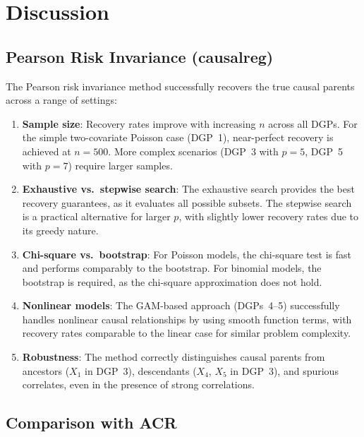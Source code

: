 \documentclass[11pt,a4paper]{article}
\begin{document}
\section{Discussion}

\subsection{Pearson Risk Invariance (causalreg)}

The Pearson risk invariance method successfully recovers the true causal parents across a range of settings:

\begin{enumerate}
    \item \textbf{Sample size}: Recovery rates improve with increasing $n$ across all DGPs. For the simple two-covariate Poisson case (DGP~1), near-perfect recovery is achieved at $n = 500$. More complex scenarios (DGP~3 with $p=5$, DGP~5 with $p=7$) require larger samples.

    \item \textbf{Exhaustive vs.\ stepwise search}: The exhaustive search provides the best recovery guarantees, as it evaluates all possible subsets. The stepwise search is a practical alternative for larger $p$, with slightly lower recovery rates due to its greedy nature.

    \item \textbf{Chi-square vs.\ bootstrap}: For Poisson models, the chi-square test is fast and performs comparably to the bootstrap. For binomial models, the bootstrap is required, as the chi-square approximation does not hold.

    \item \textbf{Nonlinear models}: The GAM-based approach (DGPs~4--5) successfully handles nonlinear causal relationships by using smooth function terms, with recovery rates comparable to the linear case for similar problem complexity.

    \item \textbf{Robustness}: The method correctly distinguishes causal parents from ancestors ($X_1$ in DGP~3), descendants ($X_4$, $X_5$ in DGP~3), and spurious correlates, even in the presence of strong correlations.
\end{enumerate}

\subsection{Comparison with ACR}
\end{document}
